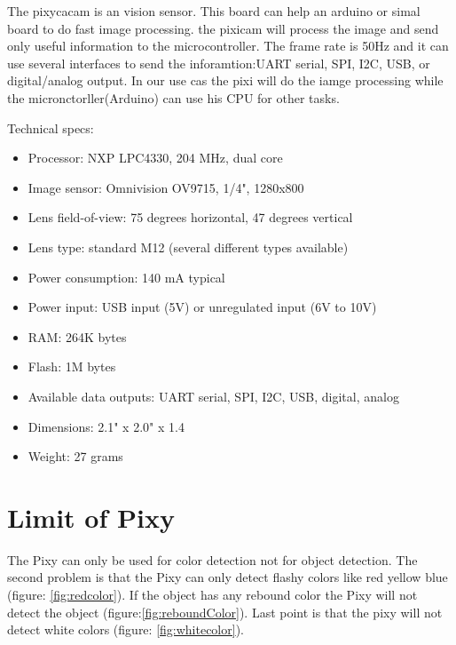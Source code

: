 \documentclass[english]{book_template} %
\begin{document}
The pixycacam is an vision sensor. This board can help an arduino or simal board to do fast image processing. the pixicam will process the image and send only useful information to the microcontroller. The frame rate is 50Hz and it can use several interfaces to send the inforamtion:UART serial, SPI, I2C, USB, or digital/analog output. In our use cas the pixi will do the iamge processing while the micronctorller(Arduino) can use his CPU for other tasks.\cite{pixy}

\begin{description}
	\item[Technical specs:]
\end{description}
\begin{itemize}
\item Processor: NXP LPC4330, 204 MHz, dual core
\item Image sensor: Omnivision OV9715, 1/4", 1280x800
\item Lens field-of-view: 75 degrees horizontal, 47 degrees vertical
\item Lens type: standard M12 (several different types available)
\item Power consumption: 140 mA typical
\item Power input: USB input (5V) or unregulated input (6V to 10V)
\item RAM: 264K bytes
\item Flash: 1M bytes
\item Available data outputs: UART serial, SPI, I2C, USB, digital, analog
\item Dimensions: 2.1" x 2.0" x 1.4
\item Weight: 27 grams
\end{itemize}

\section{Limit of Pixy}

The Pixy can only be used for color detection not for object detection. The second problem is that the Pixy can only detect flashy colors like red yellow blue (figure: \ref{fig:redcolor}). If the object has any rebound color the Pixy will not detect the object (figure:\ref{fig:reboundColor}). Last point is that the pixy will not detect white colors (figure: \ref{fig:whitecolor}). 
\end{document}
